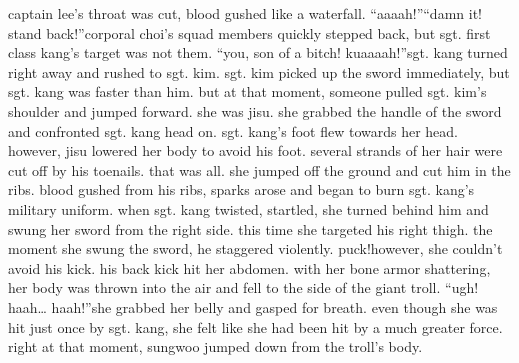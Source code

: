 captain lee’s throat was cut, blood gushed like a waterfall.
“aaaah!”“damn it! stand back!”corporal choi’s squad members quickly stepped back, but sgt.
 first class kang’s target was not them.
“you, son of a bitch! kuaaaah!”sgt.
 kang turned right away and rushed to sgt.
 kim.
 sgt.
 kim picked up the sword immediately, but sgt.
 kang was faster than him.
but at that moment, someone pulled sgt.
 kim’s shoulder and jumped forward.
 she was jisu.
she grabbed the handle of the sword and confronted sgt.
 kang head on.
sgt.
 kang’s foot flew towards her head.
 however, jisu lowered her body to avoid his foot.
 several strands of her hair were cut off by his toenails.
 that was all.
she jumped off the ground and cut him in the ribs.
blood gushed from his ribs, sparks arose and began to burn sgt.
 kang’s military uniform.
when sgt.
 kang twisted, startled, she turned behind him and swung her sword from the right side.
this time she targeted his right thigh.
the moment she swung the sword, he staggered violently.
puck!however, she couldn’t avoid his kick.
 his back kick hit her abdomen.
with her bone armor shattering, her body was thrown into the air and fell to the side of the giant troll.
“ugh! haah… haah!”she grabbed her belly and gasped for breath.
 even though she was hit just once by sgt.
 kang, she felt like she had been hit by a much greater force.
right at that moment, sungwoo jumped down from the troll’s body.

